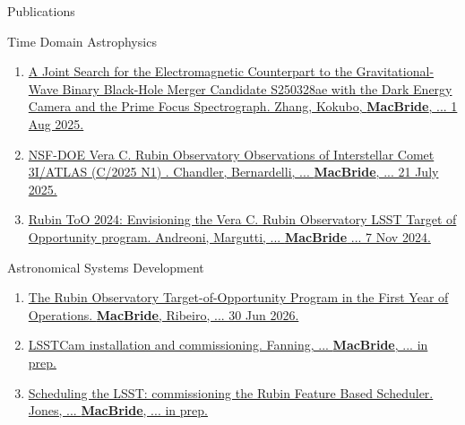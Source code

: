 \documentclass{resume} %
\begin{document}
\begin{rSection}{Publications}
\begin{rSubsection}{Time Domain Astrophysics}{}{}{}
\begin{enumerate}
    \item \href{https://arxiv.org/abs/2508.00291}{A Joint Search for the Electromagnetic Counterpart to the Gravitational-Wave Binary Black-Hole Merger Candidate S250328ae with the Dark Energy Camera and the Prime Focus Spectrograph. Zhang, Kokubo, \textbf{MacBride}, ... 1 Aug 2025.} 
    \item \href{https://arxiv.org/pdf/2507.13409}{NSF-DOE Vera C. Rubin Observatory Observations of Interstellar Comet 3I/ATLAS (C/2025 N1) . Chandler, Bernardelli, ... \textbf{MacBride}, ... 21 July 2025.} 
    \item \href{https://arxiv.org/abs/2411.04793}{Rubin ToO 2024: Envisioning the Vera C. Rubin Observatory LSST Target of Opportunity program. Andreoni, Margutti, ... \textbf{MacBride} ... 7 Nov 2024.} 
\end{enumerate}
\end{rSubsection}

\begin{rSubsection}{Astronomical Systems Development}{}{}{}
\begin{enumerate}
    \item \href{https://arxiv.org/abs/2607.00217}{The Rubin Observatory Target-of-Opportunity Program in the First Year of Operations. \textbf{MacBride}, Ribeiro, ... 30 Jun 2026.}
    \item \href{}{\ac{LSSTCam} installation and commissioning. Fanning, ... \textbf{MacBride}, ... in prep.}
    \item \href{}{Scheduling the LSST: commissioning the Rubin Feature Based Scheduler. Jones, ... \textbf{MacBride}, ... in prep.}
\end{enumerate}
\end{rSubsection}
\end{rSection}
\end{document}
